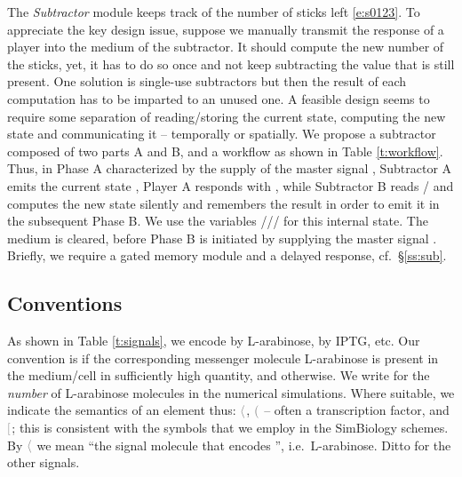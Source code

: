 \documentclass[12pt,notitlepage]{article}
\newcommand{\cbra}[1]{{\ensuremath{\color{gray}{#1}}}}
\newcommand{\signal}[1]{{{\cbra{\langle}\ce{#1}\cbra{\rangle}}}}
\newcommand{\protein}[1]{{{\cbra{(}\ce{#1}\cbra{)}}}}
\newcommand{\promoter}[1]{{{\cbra{[}\ce{#1}\cbra{]}}}}
\begin{document}
%

The \emph{Subtractor} module
keeps track of the number of sticks left \eqref{e:s0123}.
To appreciate the key design issue, suppose
we manually transmit the response 
of a player
into the medium of the subtractor.
It should compute the new number of the sticks,
yet, it has to do so once
and not keep subtracting the value 
that is still present.
One solution is single-use subtractors
but then the result of each computation
has to be imparted to an unused one.
%
A feasible design
seems to require some separation of
reading/storing the current state,
computing the new state and communicating it
--
temporally or spatially.
%
%
%
We propose 
a subtractor composed of two parts A and B,
and
a workflow 
as shown in Table \ref{t:workflow}.
%
%
%
Thus,
in Phase A characterized by the supply of 
the master signal ,
Subtractor A
emits the current state ,
Player A responds with ,
while
Subtractor B
reads /
and
computes the new state %
{silently}
and remembers the result
in order to emit it in the subsequent Phase B.
%
%
We use the variables ///
for this internal state.
%
%
The medium is cleared, before
Phase B is initiated by
supplying the master signal .
%
%
Briefly,
we require
a gated memory module and a delayed response,
cf.~\S\ref{ss:sub}.
%
%

%





\subsection{Conventions}



%
As shown in Table \ref{t:signals},
we encode  by L-arabinose,
 by IPTG, etc.
%
Our convention is 
if 
the corresponding messenger molecule L-arabinose 
is present in the medium/cell 
in sufficiently high quantity,
and  otherwise.
%
We write  for
the \emph{number} of L-arabinose molecules 
in the numerical simulations.
%
Where suitable,
we indicate the semantics of an element thus:
\signal{signal},
\protein{protein} -- often a transcription factor,
and
\promoter{promoter};
%
this is consistent with 
the symbols that we employ in
the SimBiology schemes.
%
By \signal{w_A} we mean 
``the signal molecule that encodes '',
i.e.~L-arabinose.
%
Ditto for the other signals.
\end{document}
